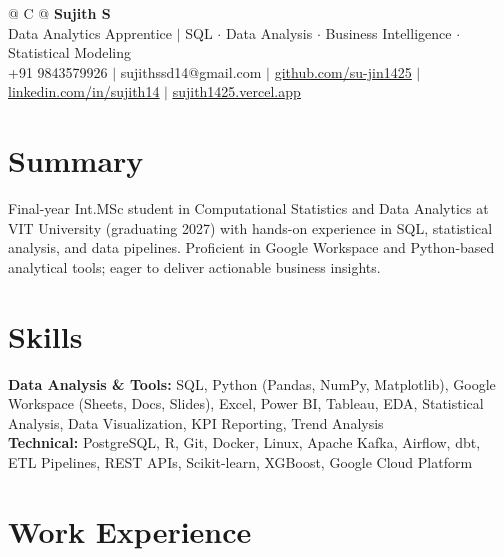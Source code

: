 \documentclass[a4paper,10pt]{article}
\newcommand{\ulink}[2]{\href{#1}{\uline{#2}}}
\begin{document}
\pagestyle{empty}

\begin{tabularx}{\linewidth}{@{} C @{}}
{\color[HTML]{000000}\fontsize{30}{35}\selectfont\bfseries Sujith S} \\[5pt]
{\fontsize{10.5}{12.5}\selectfont\color[HTML]{3A3A3A}
Data Analytics Apprentice $|$ SQL $\cdot$ Data Analysis $\cdot$ Business Intelligence $\cdot$ Statistical Modeling} \\[6pt]
{\fontsize{9.5}{11.5}\selectfont\textcolor[HTML]{3A3A3A}{+91 9843579926 $|$ sujithssd14@gmail.com $|$ \ulink{https://github.com/su-jin1425}{github.com/su-jin1425} $|$ \ulink{https://linkedin.com/in/sujith14}{linkedin.com/in/sujith14} $|$ \ulink{https://sujith1425.vercel.app}{sujith1425.vercel.app}}}
\end{tabularx}

\vspace{2pt}

\section{Summary}
\vspace{3pt}
{\color[HTML]{0A0A0A}\fontsize{11}{14}\selectfont
Final-year Int.MSc student in Computational Statistics and Data Analytics at VIT University (graduating 2027) with hands-on experience in SQL, statistical analysis, and data pipelines. Proficient in Google Workspace and Python-based analytical tools; eager to deliver actionable business insights.}

\vspace{2pt}

\section{Skills}
\vspace{3pt}
{\color[HTML]{0A0A0A}\fontsize{11}{14}\selectfont
\textbf{Data Analysis \& Tools:} SQL, Python (Pandas, NumPy, Matplotlib), Google Workspace (Sheets, Docs, Slides), Excel, Power BI, Tableau, EDA, Statistical Analysis, Data Visualization, KPI Reporting, Trend Analysis \\[2pt]
\textbf{Technical:} PostgreSQL, R, Git, Docker, Linux, Apache Kafka, Airflow, dbt, ETL Pipelines, REST APIs, Scikit-learn, XGBoost, Google Cloud Platform}

\vspace{2pt}

\section{Work Experience}
\vspace{2pt}
\end{document}
